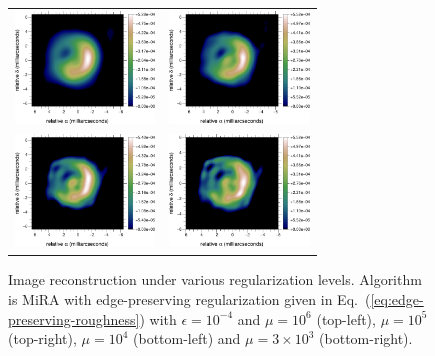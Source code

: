 \documentclass{article}
\newcommand{\Eq}[1]{Eq.~(\ref{#1})}
\newcommand{\Mira}{MiRA\xspace}
\begin{document}
\begin{figure}[!t]
  \centering
  \begin{tabular}{lr}
  \includegraphics[height=30mm]{fig4a} &
  \includegraphics[height=30mm]{fig4b} \\[2mm]
  \includegraphics[height=30mm]{fig4c} &
  \includegraphics[height=30mm]{fig4d}\\
  \end{tabular}
  \caption{Image reconstruction under various regularization levels.
    Algorithm is \Mira with edge-preserving regularization given in
    \Eq{eq:edge-preserving-roughness} with $\epsilon=10^{-4}$ and $\mu=10^{6}$
    (top-left), $\mu=10^{5}$ (top-right), $\mu=10^{4}$ (bottom-left) and
    $\mu=3\times10^{3}$ (bottom-right).}
  \label{fig:regularization-levels}
\end{figure}



\end{document}
